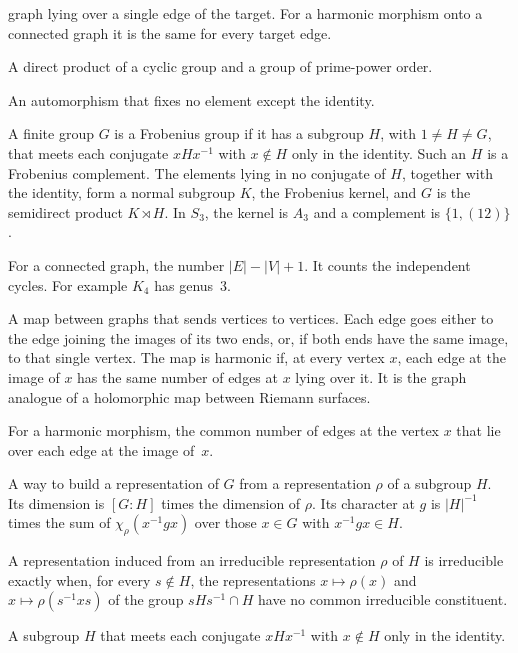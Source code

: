 \documentclass[12pt,letterpaper]{article}
\numberwithin{equation}{section}
\theoremstyle{plain}
\theoremstyle{definition}
\begin{document}
\begin{description}[itemsep=3pt,leftmargin=0pt]
  graph lying over a single edge of the target. For a harmonic morphism
  onto a connected graph it is the same for every target edge.
\item[Elementary group.] A direct product of a cyclic group and a group of
  prime-power order.
\item[Fixed-point-free automorphism.] An automorphism that fixes no element
  except the identity.
\item[Frobenius group, kernel, complement.] A finite group $G$ is a Frobenius
  group if it has a subgroup $H$, with $1\neq H\neq G$, that meets each
  conjugate $xHx^{-1}$ with $x\notin H$ only in the identity. Such an $H$ is a
  Frobenius complement. The elements lying in no conjugate of $H$, together
  with the identity, form a normal subgroup $K$, the Frobenius kernel, and
  $G$ is the semidirect product $K\rtimes H$. In $S_3$, the kernel is $A_3$
  and a complement is $\{1,(12)\}$.
\item[Genus of a graph.] For a connected graph, the number $|E|-|V|+1$. It
  counts the independent cycles. For example $K_4$ has genus~$3$.
\item[Harmonic morphism.] A map between graphs that sends vertices to
  vertices. Each edge goes either to the edge joining the images of its two
  ends, or, if both ends have the same image, to that single vertex. The map
  is harmonic if, at every vertex $x$, each edge at the image of $x$ has the
  same number of edges at $x$ lying over it. It is the graph analogue of a
  holomorphic map between Riemann surfaces.
\item[Horizontal multiplicity $m(x)$.] For a harmonic morphism, the common
  number of edges at the vertex $x$ that lie over each edge at the image
  of~$x$.
\item[Induced representation.] A way to build a representation of $G$ from a
  representation $\rho$ of a subgroup $H$. Its dimension is $[G:H]$ times
  the dimension of $\rho$. Its character at $g$ is $|H|^{-1}$ times the sum
  of $\chi_\rho(x^{-1}gx)$ over those $x\in G$ with $x^{-1}gx\in H$.
\item[Mackey's criterion.] A representation induced from an irreducible
  representation $\rho$ of $H$ is irreducible exactly when, for every
  $s\notin H$, the representations $x\mapsto\rho(x)$ and
  $x\mapsto\rho(s^{-1}xs)$ of the group $sHs^{-1}\cap H$ have no common
  irreducible constituent.
\item[Malnormal subgroup.] A subgroup $H$ that meets each conjugate
  $xHx^{-1}$ with $x\notin H$ only in the identity.

\end{description}
\end{document}
